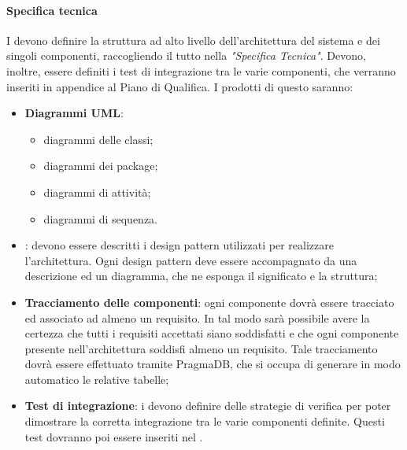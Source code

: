 \paragraph{Specifica tecnica}\label{Specifica tecnica}
 I \PJP{} devono definire la struttura ad alto livello dell'architettura del sistema e dei singoli
componenti, raccogliendo il tutto nella \textit{"Specifica Tecnica"}. Devono, inoltre, essere definiti i test di
integrazione tra le varie componenti, che verranno inseriti in appendice al Piano di Qualifica.
I prodotti di questo  saranno:
 \begin{itemize}
 	\item \textbf{Diagrammi UML}:
 	\begin{itemize}
 		\item diagrammi delle classi;
 		\item diagrammi dei package;
 		\item diagrammi di attività;
 		\item diagrammi di sequenza.
 	\end{itemize}
 	\item \textbf{}: devono essere descritti i design pattern utilizzati per realizzare l'architettura. Ogni design
 	pattern deve essere accompagnato da una descrizione ed un diagramma, che ne esponga il
 	significato e la struttura;
 	\item \textbf{Tracciamento delle componenti}: ogni componente dovrà essere tracciato ed associato
 	ad almeno un requisito. In tal modo sarà possibile avere la certezza che tutti i requisiti
 	accettati siano soddisfatti e che ogni componente presente nell’architettura soddisfi almeno
 	un requisito. Tale tracciamento dovrà essere effettuato tramite PragmaDB, che si occupa
 	di generare in modo automatico le relative tabelle;
 	\item \textbf{Test di integrazione}: i \PJP{} devono definire delle strategie di verifica per poter dimostrare la corretta integrazione tra le varie componenti definite. Questi test dovranno poi essere inseriti nel .
 \end{itemize}
